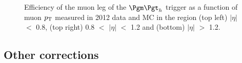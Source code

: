 \begin{figure}[htb]

\begin{center}
\end{center}
\caption[Efficiency of the muon leg of the $\mutau$ trigger as a function of muon $\pt$ measured in
2012 data and MC.]{Efficiency of the muon leg of the $\mutau$ trigger as a function of muon $\pt$ measured in
2012 data and MC in the region (top left) $|\eta|$ $<$ 0.8, (top right) 0.8
$<$ $|\eta|$ $<$ 1.2 and (bottom) $|\eta|$ $>$ 1.2.}
\label{fig:muontrg}
\end{figure}

\subsection{Other corrections}
\label{sec:othercorrections}

